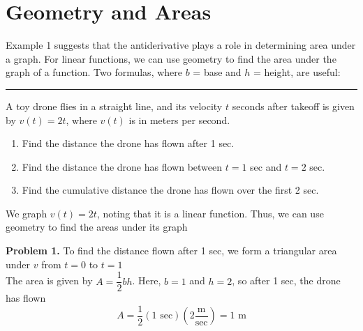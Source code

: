 \documentclass{report}
\begin{document}
\section*{Geometry and Areas}
Example 1 suggests that the antiderivative plays a role in determining area under a graph. For linear functions, we can use geometry to find the area under the graph of a function. Two formulas, where $b$ = base and $h$ = height, are useful:
\bigbreak \noindent
\hspace{15mm}\begin{minipage}{0.5\textwidth}
	
\end{minipage}
\begin{minipage}{0.5\textwidth}
\end{minipage}
\begin{figure}[ht]
    \centering
\end{figure}
\begin{figure}[ht]
    \centering
\end{figure}
\vspace{-7mm}
\hrule
\bigbreak \noindent
\begin{mdframed}
\q
A toy drone flies in a straight line, and its velocity $t$ seconds after takeoff is given by $v(t) = 2t$, where $v(t)$ is in meters per second.
\begin{enumerate}
  \item Find the distance the drone has flown after 1 sec.
  \item Find the distance the drone has flown between $t=1$ sec and $t=2$ sec.
  \item Find the cumulative distance the drone has flown over the first 2 sec.
  
\end{enumerate}
\end{mdframed}
\sol
We graph $v(t) = 2t$, noting that it is a linear function. Thus, we can use geometry to find the areas under its graph
\bigbreak \noindent 
\begin{minipage}{0.5\textwidth}
  \textbf{Problem 1.} To find the distance flown after 1 sec, we form a triangular area under $v$ from $t= 0$ to $t=1$ \\ The area is given by $A =\dfrac{1}{2}bh$. Here, $b=1$ and $h=2$, so after 1 sec, the drone has flown
  $$ A = \dfrac{1}{2}\left(1 \text{ sec}\right)\left(2\dfrac{\text{m}}{\text{sec}}\right) = 1 \text{ m}$$
\end{minipage}
\hspace{10mm}\begin{minipage}{0.5\textwidth}
	
\end{minipage}
\begin{figure}[ht]
    \centering
\end{figure}
\end{document}
